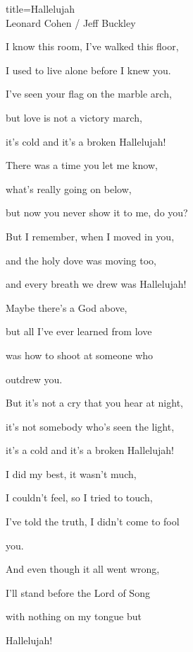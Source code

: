 \begin{song}{title=\predtitle\centering Hallelujah \\\large Leonard Cohen / Jeff Buckley \vspace*{-0.3cm}}
{\begin{centerjustified}
\begin{varwidth}[t]{0.5\textwidth}
	I know this room, I've walked this floor,

	I used to live alone before I knew you.

	I've seen your flag on the marble arch,

	but love is not a victory march,

	it's cold and it's a broken Hallelujah!


\sloka
	There was a time you let me know,

	what's really going on below,

	but now you never show it to me, do you?

	But I remember, when I moved in you,

	and the holy dove was moving too,

	and every breath we drew was Hallelujah!


\sloka
	Maybe there's a God above,
	
	but all I've ever learned from love
	
	was how to shoot at someone who

	outdrew you.

	But it's not a cry that you hear at night,

	it's not somebody who's seen the light,

	it's a cold and it's a broken Hallelujah!

\sloka
	I did my best, it wasn't much,

	I couldn't feel, so I tried to touch,

	I've told the truth, I didn't come to fool

	you.

	And even though it all went wrong,

	I'll stand before the Lord of Song

	with nothing on my tongue but

	Hallelujah!


\end{varwidth}   %

\end{centerjustified}
}

\centering
{}

\setcounter{Slokočet}{0}
\end{song}
